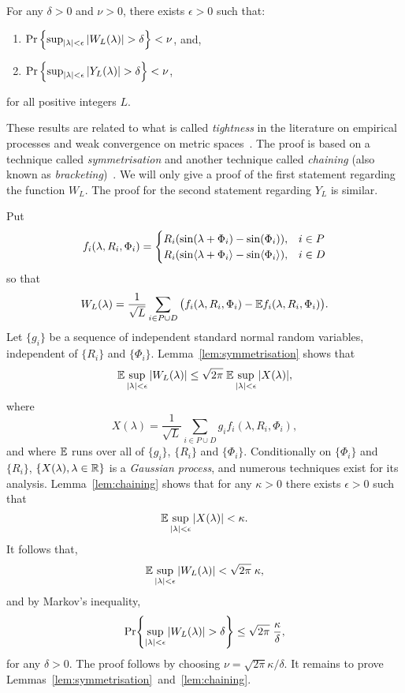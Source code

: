 \documentclass[journal]{IEEEtran}
\begin{document}
\begin{lemma}\label{lem:ZYLempiricproc}
For any $\delta > 0$ and $\nu > 0$, there exists $\epsilon > 0$ such that:
\begin{enumerate}
\item $\Pr\left\{ \sup_{{\vert \lambda \vert}<\epsilon}{\vert W_L(\lambda) \vert} > \delta  \right\} < \nu$, and,
\item $\Pr\left\{ \sup_{{\vert \lambda \vert}<\epsilon}{\vert Y_L(\lambda) \vert} > \delta  \right\} < \nu$,
\end{enumerate}
for all positive integers $L$.
\end{lemma}
\begin{IEEEproof}
These results are related to what is called \emph{tightness} in the literature on empirical processes and weak convergence on metric spaces~\cite{Billingsley1999_convergence_of_probability_measures,Dudley_unif_central_lim_th_1999,Shorak_emp_proc_stat_2009}.  The proof is based on a technique called \emph{symmetrisation} and another technique called \emph{chaining} (also known as \emph{bracketing})~\cite{Pollard_asymp_empi_proc_1989}.  We will only give a proof of the first statement regarding the function $W_L$.  The proof for the second statement regarding $Y_L$ is similar.  

Put 
\[
f_i(\lambda, R_i, \Phi_i) = \begin{cases}
R_i( \sin(\lambda + \Phi_i) - \sin(\Phi_i)), & i \in P \\
R_i( \sin\langle \lambda + \Phi_i \rangle - \sin\langle \Phi_i \rangle), & i \in D \\
\end{cases}
\]
so that
\[
W_L(\lambda) = \frac{1}{\sqrt{L}} \sum_{i \in P \cup D} \big( f_i(\lambda, R_i, \Phi_i) - {\mathbb E} f_i(\lambda, R_i, \Phi_i) \big).
\]
Let $\{g_i\}$ be a sequence of independent standard normal random variables, independent of $\{R_i\}$ and $\{\Phi_i\}$.  Lemma~\ref{lem:symmetrisation} shows that
\[
{\mathbb E} \sup_{{\vert \lambda \vert} < \epsilon} {\left\vert  W_L(\lambda) \right\vert} \leq \sqrt{2\pi} \; {\mathbb E} \sup_{{\vert \lambda \vert} < \epsilon}  {\left\vert  X(\lambda)  \right\vert},
\]
where 
\begin{equation}\label{eq:ZpsiCondGaussProc}
X(\lambda) = \frac{1}{\sqrt{L}} \sum_{i \in P \cup D} g_i f_i(\lambda, R_i, \Phi_i),
\end{equation}
and where ${\mathbb E}$ runs over all of $\{g_i\}$, $\{R_i\}$ and $\{\Phi_i\}$.  Conditionally on $\{\Phi_i\}$ and $\{R_i\}$, $\{X(\lambda), \lambda \in {\mathbb R} \}$ is a \emph{Gaussian process}, and numerous techniques exist for its analysis.  Lemma~\ref{lem:chaining} shows that for any $\kappa > 0$ there exists $\epsilon > 0$ such that
\[
{\mathbb E} \sup_{{\vert \lambda \vert} < \epsilon} {\left\vert  X(\lambda)  \right\vert} < \kappa.
\]
It follows that,
\[
{\mathbb E} \sup_{{\vert \lambda \vert} < \epsilon} {\left\vert  W_L(\lambda) \right\vert}  <  \sqrt{2\pi} \; \kappa,
\]
and by Markov's inequality,
\[
{\operatorname{Pr}} {\left\{   \sup_{{\vert \lambda \vert} < \epsilon} {\left\vert  W_L(\lambda) \right\vert} > \delta  \right\}} \leq  \sqrt{2\pi} \; \frac{\kappa}{\delta},
\]
for any $\delta > 0$.  The proof follows by choosing $\nu =  \sqrt{2\pi} \kappa/\delta$.  It remains to prove Lemmas~\ref{lem:symmetrisation}~and~\ref{lem:chaining}.
\end{IEEEproof}
\end{document}
